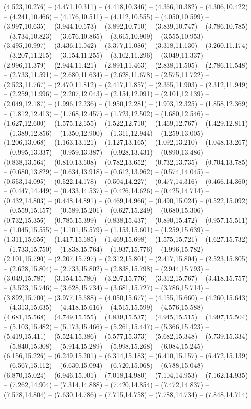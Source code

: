 (4.523,10.276) -- (4.471,10.311) -- (4.418,10.346) -- (4.366,10.382) -- (4.306,10.422) -- (4.241,10.466) -- (4.176,10.511) -- (4.112,10.555) -- (4.050,10.599) -- (3.997,10.635) -- (3.944,10.673) -- (3.892,10.710) -- (3.839,10.747) -- (3.786,10.785) -- (3.734,10.823) -- (3.676,10.865) -- (3.615,10.909) -- (3.555,10.953) -- (3.495,10.997) -- (3.436,11.042) -- (3.377,11.086) -- (3.318,11.130) -- (3.260,11.174) -- (3.207,11.215) -- (3.154,11.255) -- (3.102,11.296) -- (3.049,11.337) -- (2.996,11.379) -- (2.944,11.421) -- (2.891,11.463) -- (2.838,11.505) -- (2.786,11.548) -- (2.733,11.591) -- (2.680,11.634) -- (2.628,11.678) -- (2.575,11.722) -- (2.523,11.767) -- (2.470,11.812) -- (2.417,11.857) -- (2.365,11.903) -- (2.312,11.949) -- (2.259,11.996) -- (2.207,12.043) -- (2.154,12.091) -- (2.101,12.139) -- (2.049,12.187) -- (1.996,12.236) -- (1.950,12.281) -- (1.903,12.325) -- (1.858,12.369) -- (1.812,12.413) -- (1.768,12.457) -- (1.723,12.502) -- (1.680,12.546) -- (1.627,12.600) -- (1.575,12.655) -- (1.522,12.710) -- (1.469,12.767) -- (1.429,12.811) -- (1.389,12.856) -- (1.350,12.900) -- (1.311,12.944) -- (1.259,13.005) -- (1.206,13.068) -- (1.163,13.121) -- (1.127,13.165) -- (1.092,13.210) -- (1.048,13.267) -- (0.995,13.337) -- (0.959,13.387) -- (0.928,13.431) -- (0.890,13.486) -- (0.838,13.564) -- (0.810,13.608) -- (0.782,13.652) -- (0.732,13.735) -- (0.704,13.785) -- (0.680,13.829) -- (0.634,13.918) -- (0.612,13.962) -- (0.574,14.045) -- (0.553,14.095) -- (0.522,14.178) -- (0.504,14.227) -- (0.477,14.316) -- (0.466,14.360) -- (0.447,14.449) -- (0.433,14.537) -- (0.426,14.626) -- (0.425,14.714) -- (0.432,14.803) -- (0.448,14.891) -- (0.469,14.966) -- (0.490,15.024) -- (0.522,15.092) -- (0.559,15.157) -- (0.589,15.201) -- (0.627,15.249) -- (0.680,15.306) -- (0.732,15.356) -- (0.785,15.399) -- (0.838,15.437) -- (0.890,15.472) -- (0.957,15.511) -- (1.045,15.555) -- (1.101,15.579) -- (1.153,15.601) -- (1.259,15.639) -- (1.311,15.656) -- (1.417,15.685) -- (1.469,15.698) -- (1.575,15.721) -- (1.627,15.732) -- (1.733,15.750) -- (1.838,15.764) -- (1.937,15.776) -- (1.996,15.782) -- (2.101,15.790) -- (2.207,15.797) -- (2.312,15.801) -- (2.417,15.804) -- (2.523,15.805) -- (2.628,15.804) -- (2.733,15.802) -- (2.838,15.798) -- (2.944,15.793) -- (3.049,15.787) -- (3.154,15.780) -- (3.207,15.776) -- (3.312,15.767) -- (3.418,15.757) -- (3.523,15.746) -- (3.628,15.734) -- (3.681,15.727) -- (3.786,15.714) -- (3.892,15.700) -- (3.977,15.688) -- (4.050,15.677) -- (4.155,15.660) -- (4.260,15.643) -- (4.313,15.635) -- (4.418,15.616) -- (4.515,15.599) -- (4.576,15.588) -- (4.681,15.568) -- (4.749,15.555) -- (4.839,15.537) -- (4.945,15.515) -- (4.997,15.504) -- (5.103,15.482) -- (5.173,15.466) -- (5.261,15.447) -- (5.366,15.423) -- (5.419,15.411) -- (5.524,15.386) -- (5.577,15.373) -- (5.682,15.348) -- (5.739,15.334) -- (5.840,15.308) -- (5.914,15.289) -- (5.998,15.268) -- (6.084,15.245) -- (6.156,15.226) -- (6.249,15.201) -- (6.314,15.183) -- (6.410,15.157) -- (6.472,15.139) -- (6.567,15.112) -- (6.630,15.094) -- (6.720,15.068) -- (6.788,15.048) -- (6.870,15.024) -- (6.946,15.001) -- (7.018,14.980) -- (7.104,14.953) -- (7.162,14.935) -- (7.262,14.904) -- (7.314,14.888) -- (7.420,14.854) -- (7.472,14.837) -- (7.578,14.804) -- (7.630,14.786) -- (7.715,14.758) -- (7.788,14.734) -- (7.848,14.714) -- 